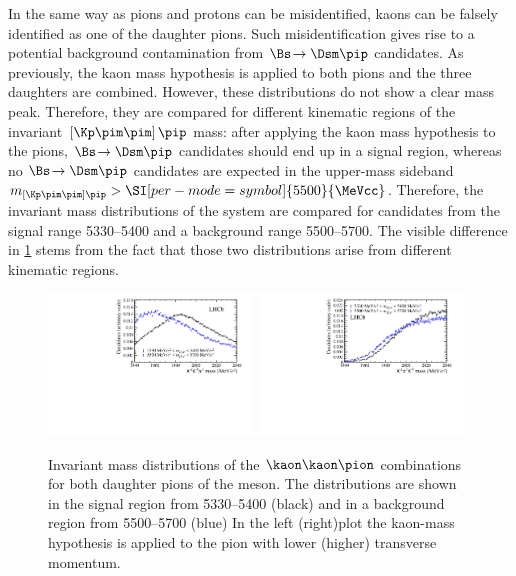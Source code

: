 In the same way as pions and protons can be misidentified, kaons can be falsely identified as one of the \Dm daughter pions.
Such misidentification gives rise to a potential background contamination from $\Bs\!\to\Dsm\pip$ candidates.
As previously, the kaon mass hypothesis is applied to both pions and the three \Dm daughters are combined.
However,  these distributions do not show a clear mass peak.
Therefore, they are compared for different kinematic regions of the invariant $\left[\Kp\pim\pim\right]\pip$ mass: after applying the kaon mass hypothesis to the pions, $\Bs\!\to\Dsm\pip$ candidates should end up in a \Bs signal region, whereas no $\Bs\!\to\Dsm\pip$ candidates are expected in the upper-mass sideband $m_{\left[\Kp\pim\pim\right]\pip}>\SI[per-mode=symbol]{5500}{\MeVcc}$.
Therefore, the invariant mass distributions of the \kaon\kaon\pion system are compared for candidates from the \Bs signal range \SIrange[per-mode=symbol]{5330}{5400}{\MeVcc} and a background range \SIrange[per-mode=symbol]{5500}{5700}{\MeVcc}.
The visible difference in \cref{fig:DsVeto} stems from the fact that those two distributions arise from different kinematic regions.
\begin{figure}[tbp]
    \centering
    \includegraphics[width=0.485\textwidth]{07selection/figs/DsHypo1.pdf}
    \includegraphics[width=0.485\textwidth]{07selection/figs/DsHypo2.pdf}
    \caption{Invariant mass distributions of the $\kaon\kaon\pion$ combinations for both daughter pions of the \Dm meson.
    The distributions are shown in the \Bs signal region from \SIrange[per-mode=symbol]{5330}{5400}{\MeVcc} (black) and in a background region from \SIrange[per-mode=symbol]{5500}{5700}{\MeVcc} (blue)
    In the left (right)plot the kaon-mass hypothesis is applied to the pion with lower (higher) transverse momentum.}
    \label{fig:DsVeto}
\end{figure}
